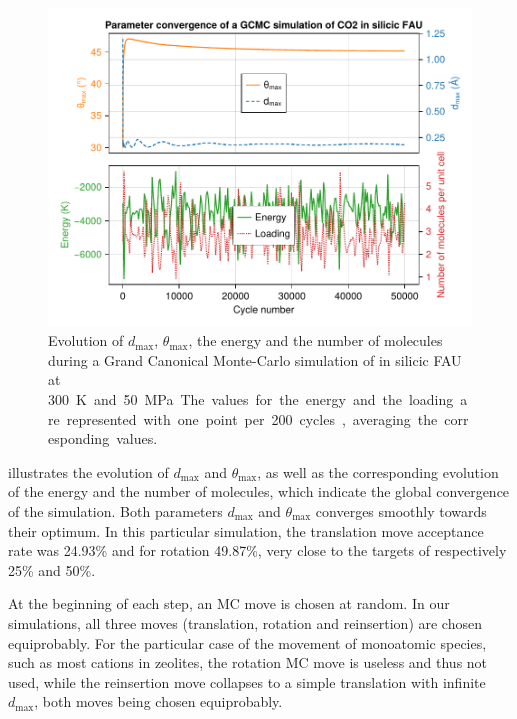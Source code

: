 \documentclass[main.tex]{subfiles}
\begin{document}
\begin{figure}
	\centering
	\includegraphics[width=\linewidth]{figures/gcmc/parameterconvergence.pdf}

	\caption{Evolution of $d_{\max}$, $\theta_{\max}$, the energy and the number of molecules during a Grand Canonical Monte-Carlo simulation of  in silicic FAU at \qty{300}K and \qty{50}{MPa}. The values for the energy and the loading are represented with one point per \num{200} cycles, averaging the corresponding values.}\label{fig:parameterconvergence}
\end{figure}

 illustrates the evolution of $d_{\max}$ and $\theta_{\max}$, as well as the corresponding evolution of the energy and the number of molecules, which indicate the global convergence of the simulation. Both parameters $d_{\max}$ and $\theta_{\max}$ converges smoothly towards their optimum. In this particular simulation, the translation move acceptance rate was \num{24.93}\% and for rotation \num{49.87}\%, very close to the targets of respectively \num{25}\% and \num{50}\%.

At the beginning of each step, an MC move is chosen at random. In our simulations, all three moves (translation, rotation and reinsertion) are chosen equiprobably. For the particular case of the movement of monoatomic species, such as most cations in zeolites, the rotation MC move is useless and thus not used, while the reinsertion move collapses to a simple translation with infinite $d_{\max}$, both moves being chosen equiprobably.
\end{document}
